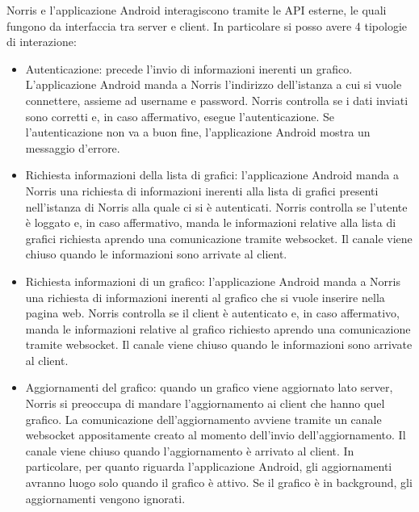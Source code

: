     Norris e l'applicazione Android interagiscono tramite le API esterne, le quali fungono da interfaccia tra server e client. In particolare si posso avere 4 tipologie di interazione:
    \begin{itemize}
        \item Autenticazione: precede l'invio di informazioni inerenti un grafico. L'applicazione Android manda a Norris l'indirizzo dell'istanza a cui si vuole connettere, assieme ad username e password. Norris controlla se i dati inviati sono corretti e, in caso affermativo, esegue l'autenticazione. Se l'autenticazione non va a buon fine, l'applicazione Android mostra un messaggio d'errore.
        \item Richiesta informazioni della lista di grafici: l'applicazione Android manda a Norris una richiesta di informazioni inerenti alla lista di grafici presenti nell'istanza di Norris alla quale ci si è autenticati. Norris controlla se l'utente è loggato e, in caso affermativo, manda le informazioni relative alla lista di grafici richiesta aprendo una comunicazione tramite websocket. Il canale viene chiuso quando le informazioni sono arrivate al client.
        \item Richiesta informazioni di un grafico: l'applicazione Android manda a Norris una richiesta di informazioni inerenti al grafico che si vuole inserire nella pagina web. Norris controlla se il client è autenticato e, in caso affermativo, manda le informazioni relative al grafico richiesto aprendo una comunicazione tramite websocket. Il canale viene chiuso quando le informazioni sono arrivate al client.
        \item Aggiornamenti del grafico: quando un grafico viene aggiornato lato server, Norris si preoccupa di mandare l'aggiornamento ai client che hanno quel grafico. La comunicazione dell'aggiornamento avviene tramite un canale websocket appositamente creato al momento dell'invio dell'aggiornamento. Il canale viene chiuso quando l'aggiornamento è arrivato al client. In particolare, per quanto riguarda l'applicazione Android, gli aggiornamenti avranno luogo solo quando il grafico è attivo. Se il grafico è in background, gli aggiornamenti vengono ignorati.
    \end{itemize}

